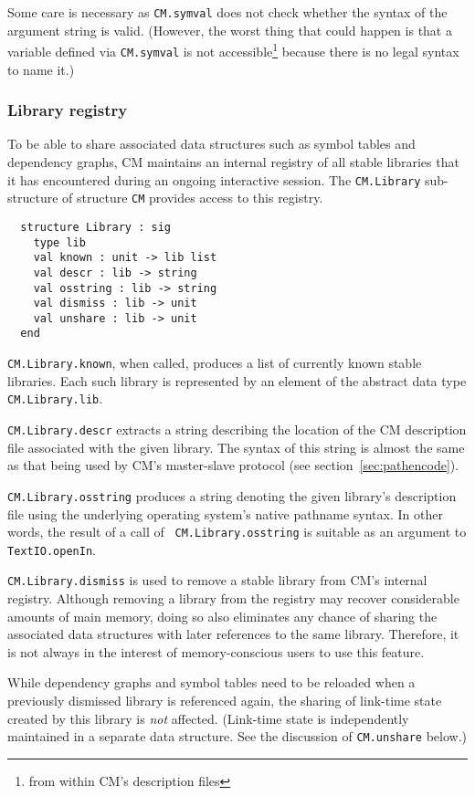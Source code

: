 \documentclass[titlepage,letterpaper]{article}
\begin{document}
Some care is necessary as {\tt CM.symval} does not check whether the
syntax of the argument string is valid.  (However, the worst thing
that could happen is that a variable defined via {\tt CM.symval} is
not accessible\footnote{from within CM's description files} because
there is no legal syntax to name it.)

\subsubsection{Library registry}
\label{sec:libreg}

To be able to share associated data structures such as symbol tables
and dependency graphs, CM maintains an internal registry of all stable
libraries that it has encountered during an ongoing interactive
session.  The {\tt CM.Library} sub-structure of structure {\tt CM}
provides access to this registry.

\begin{verbatim}
  structure Library : sig
    type lib
    val known : unit -> lib list
    val descr : lib -> string
    val osstring : lib -> string
    val dismiss : lib -> unit
    val unshare : lib -> unit
  end
\end{verbatim}

{\tt CM.Library.known}, when called, produces a list of currently
known stable libraries.  Each such library is represented by an
element of the abstract data type {\tt CM.Library.lib}.

{\tt CM.Library.descr} extracts a string describing the location of
the CM description file associated with the given library.  The syntax
of this string is almost the same as that being used by CM's
master-slave protocol (see section~\ref{sec:pathencode}).

{\tt CM.Library.osstring} produces a string denoting the given
library's description file using the underlying operating system's
native pathname syntax.  In other words, the result of a call of {\tt
CM.Library.osstring} is suitable as an argument to {\tt
TextIO.openIn}.

{\tt CM.Library.dismiss} is used to remove a stable library from CM's
internal registry.  Although removing a library from the registry may
recover considerable amounts of main memory, doing so also eliminates
any chance of sharing the associated data structures with later
references to the same library.  Therefore, it is not always in the
interest of memory-conscious users to use this feature.

While dependency graphs and symbol tables need to be reloaded when a
previously dismissed library is referenced again, the sharing of
link-time state created by this library is {\em not} affected.
(Link-time state is independently maintained in a separate data
structure.  See the discussion of {\tt CM.unshare} below.)
\end{document}

